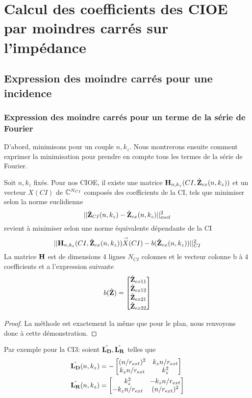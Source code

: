 \section{Calcul des coefficients des CIOE par moindres carrés sur l'impédance}

  \subsection{Expression des moindre carrés pour une incidence}

    \subsubsection{Expression des moindre carrés pour un terme de la série de Fourier}
      D'abord, minimisons pour un couple \(n,k_z\). Nous montrerons ensuite comment exprimer la minimisation pour prendre en compte tous les termes de la série de Fourier.
      \begin{prop}
        Soit \(n,k_z\) fixés.
        Pour nos CIOE, il existe une matrice \(\mathbf{H}_{n,k_z}(CI,\hat{\mathbf{Z}}_{ex}(n,k_z))\) et un vecteur \(X(CI)\) de \(\mathbb C^{N_{CI}}\) composés des coefficients de la CI, tels que minimiser selon la norme euclidienne
        \[
          ||\hat{\mathbf{Z}}_{CI}(n,k_z)-\hat{\mathbf{Z}}_{ex}(n,k_z)||^2_{eucl}
        \] 
        revient à minimiser selon une norme équivalente dépendante de la CI
        \[ 
          || \mathbf{H}_{n,k_z}(CI,\hat{\mathbf{Z}}_{ex}(n,k_z)) {\overset{\rightarrow}{X}}(CI) - b(\hat{\mathbf{Z}}_{ex}(n,k_z)) ||^2_{CI}
        \]
        La matrice \(\mathbf{H}\) est de dimensions 4 lignes \(N_{CI}\) colonnes et le vecteur colonne b à 4 coefficients et a l'expression suivante
        \begin{align}
          b(\hat{\mathbf{Z}}) = \begin{bmatrix} \hat{\mathbf{Z}}_{ex11} \\ \hat{\mathbf{Z}}_{ex12}\\ \hat{\mathbf{Z}}_{ex21} \\ \hat{\mathbf{Z}}_{ex22} \end{bmatrix}
        \end{align}
      \end{prop}

      \begin{proof}
        La méthode est exactement la même que pour le plan, nous renvoyons donc à cette démonstration.
      \end{proof}

      Par exemple pour la CI3: soient \(\hat{\mathbf{L_D}}, \hat{\mathbf{L_R}}\) telles que
      \begin{align}
        \hat{\mathbf{L_D}}(n,k_z) & = - \begin{bmatrix} (n\slash r_{ext})^2 & k_z n \slash r_{ext} \\ k_z n\slash r_{ext} & k_z^2 \end{bmatrix}
        \\
        \hat{\mathbf{L_R}}(n,k_z) & =  \begin{bmatrix} k_z^2 & -k_z n \slash r_{ext} \\ -k_z n\slash r_{ext} &  (n\slash r_{ext})^2 \end{bmatrix}
      \end{align}

